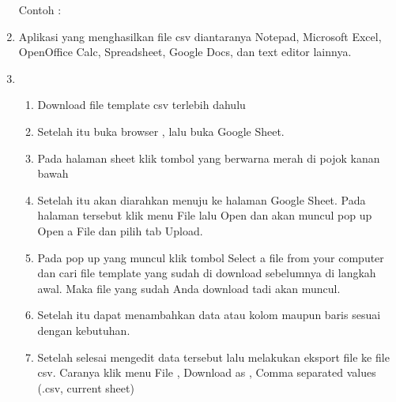 \begin{enumerate}
Contoh :


\item
Aplikasi yang menghasilkan file csv diantaranya Notepad, Microsoft Excel, OpenOffice Calc, Spreadsheet, Google Docs, dan text editor lainnya.


\item
\begin{enumerate}
\item
Download file template csv terlebih dahulu
\item
Setelah itu buka browser , lalu buka Google Sheet.
\item
Pada halaman sheet klik tombol yang berwarna merah di pojok kanan bawah 
\item
Setelah itu akan diarahkan menuju ke halaman Google Sheet. Pada halaman tersebut klik menu File lalu Open dan akan muncul pop up Open a File dan pilih tab Upload.
\item
Pada pop up yang muncul klik tombol Select a file from your computer dan cari file template yang sudah di download sebelumnya di langkah awal. Maka file yang sudah Anda download tadi akan muncul.
\item
Setelah itu dapat menambahkan data atau kolom maupun baris sesuai dengan kebutuhan. 
\item
Setelah selesai mengedit data tersebut lalu melakukan eksport file ke file csv. Caranya klik menu File , Download as , Comma  separated values (.csv, current sheet)
\end{enumerate}


\end{enumerate}

